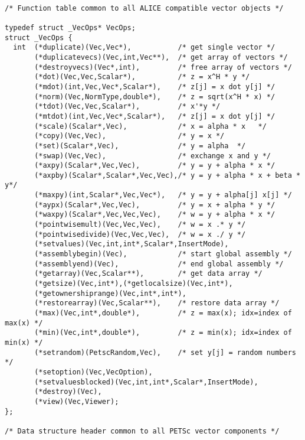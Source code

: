 \documentclass[twoside,12pt]{../sty/report_petsc}
\begin{document}
\begin{verbatim}

/* Function table common to all ALICE compatible vector objects */

typedef struct _VecOps* VecOps;
struct _VecOps {
  int  (*duplicate)(Vec,Vec*),           /* get single vector */
       (*duplicatevecs)(Vec,int,Vec**),  /* get array of vectors */
       (*destroyvecs)(Vec*,int),         /* free array of vectors */
       (*dot)(Vec,Vec,Scalar*),          /* z = x^H * y */
       (*mdot)(int,Vec,Vec*,Scalar*),    /* z[j] = x dot y[j] */
       (*norm)(Vec,NormType,double*),    /* z = sqrt(x^H * x) */
       (*tdot)(Vec,Vec,Scalar*),         /* x'*y */
       (*mtdot)(int,Vec,Vec*,Scalar*),   /* z[j] = x dot y[j] */
       (*scale)(Scalar*,Vec),            /* x = alpha * x   */
       (*copy)(Vec,Vec),                 /* y = x */
       (*set)(Scalar*,Vec),              /* y = alpha  */
       (*swap)(Vec,Vec),                 /* exchange x and y */
       (*axpy)(Scalar*,Vec,Vec),         /* y = y + alpha * x */
       (*axpby)(Scalar*,Scalar*,Vec,Vec),/* y = y + alpha * x + beta * y*/
       (*maxpy)(int,Scalar*,Vec,Vec*),   /* y = y + alpha[j] x[j] */
       (*aypx)(Scalar*,Vec,Vec),         /* y = x + alpha * y */
       (*waxpy)(Scalar*,Vec,Vec,Vec),    /* w = y + alpha * x */
       (*pointwisemult)(Vec,Vec,Vec),    /* w = x .* y */
       (*pointwisedivide)(Vec,Vec,Vec),  /* w = x ./ y */
       (*setvalues)(Vec,int,int*,Scalar*,InsertMode),
       (*assemblybegin)(Vec),            /* start global assembly */
       (*assemblyend)(Vec),              /* end global assembly */
       (*getarray)(Vec,Scalar**),        /* get data array */
       (*getsize)(Vec,int*),(*getlocalsize)(Vec,int*),
       (*getownershiprange)(Vec,int*,int*),
       (*restorearray)(Vec,Scalar**),    /* restore data array */
       (*max)(Vec,int*,double*),         /* z = max(x); idx=index of max(x) */
       (*min)(Vec,int*,double*),         /* z = min(x); idx=index of min(x) */
       (*setrandom)(PetscRandom,Vec),    /* set y[j] = random numbers */
       (*setoption)(Vec,VecOption),
       (*setvaluesblocked)(Vec,int,int*,Scalar*,InsertMode),
       (*destroy)(Vec),
       (*view)(Vec,Viewer);
};

/* Data structure header common to all PETSc vector components */


\end{verbatim}
\end{document}
